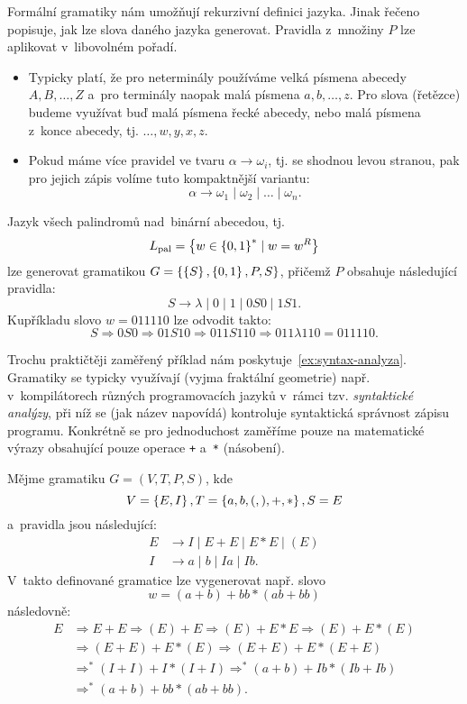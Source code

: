Formální gramatiky nám umožňují rekurzivní definici jazyka. Jinak řečeno popisuje, jak lze slova daného jazyka generovat. Pravidla z~množiny $P$ lze aplikovat v~libovolném pořadí.
\begin{remark}
    \begin{itemize}
        \item Typicky platí, že pro neterminály používáme velká písmena abecedy $A,B,\ldots,Z$ a~pro terminály naopak malá písmena $a,b,\ldots,z$. Pro slova (řetězce) budeme využívat buď malá písmena řecké abecedy, nebo malá písmena z~konce abecedy, tj. $\dots,w,y,x,z$.
        \item Pokud máme více pravidel ve tvaru $\alpha\to\omega_i$, tj. se shodnou levou stranou, pak pro jejich zápis volíme tuto kompaktnější variantu:
        \[\alpha\to\omega_1\mid\omega_2\mid\dots\mid\omega_n.\]
    \end{itemize}
\end{remark}
\begin{example}
    Jazyk všech palindromů nad~binární abecedou, tj.
    \[L_\text{pal}=\left\{w\in\left\{0,1\right\}^*\mid w=w^R\right\}\]
    lze generovat gramatikou $G=\left\{\left\{S\right\},\left\{0,1\right\},P,S\right\}$, přičemž $P$ obsahuje následující pravidla:
    \[S\to\lambda\mid 0\mid 1\mid 0S0\mid 1S1.\]
    Kupříkladu slovo $w=011110$ lze odvodit takto:
    \[S\Rightarrow 0S0\Rightarrow 01S10\Rightarrow011S110\Rightarrow011\lambda 110=011110.\]
\end{example}
Trochu praktičtěji zaměřený příklad nám poskytuje~\ref{ex:syntax-analyza}. Gramatiky se typicky využívají (vyjma fraktální geometrie) např. v~kompilátorech různých programovacích jazyků v~rámci tzv. \emph{syntaktické analýzy}, při níž se (jak název napovídá) kontroluje syntaktická správnost zápisu programu. Konkrétně se pro jednoduchost zaměříme pouze na matematické výrazy obsahující pouze operace \texttt{+} a~\texttt{*} (násobení).
\begin{example}\label{ex:syntax-analyza}
    Mějme gramatiku $G=(V,T,P,S)$, kde
    \[V=\left\{E,I\right\},T=\left\{a,b,(,),+,*\right\},S=E\]
    a~pravidla jsou následující:
    \begin{align*}
        E&\to I\mid E+E\mid E*E\mid (E)\\
        I&\to a\mid b\mid Ia\mid Ib.
    \end{align*}
    V~takto definované gramatice lze vygenerovat např. slovo
    \[w=(a+b)+bb*(ab+bb)\]
    následovně:
    \begin{align*}
        E&\Rightarrow E+E\Rightarrow(E)+E\Rightarrow(E)+E*E\Rightarrow(E)+E*(E)\\
        &\Rightarrow(E+E)+E*(E)\Rightarrow(E+E)+E*(E+E)\\
        &\Rightarrow^*(I+I)+I*(I+I)\Rightarrow^*(a+b)+Ib*(Ib+Ib)\\
        &\Rightarrow^*(a+b)+bb*(ab+bb).
    \end{align*}
\end{example}
